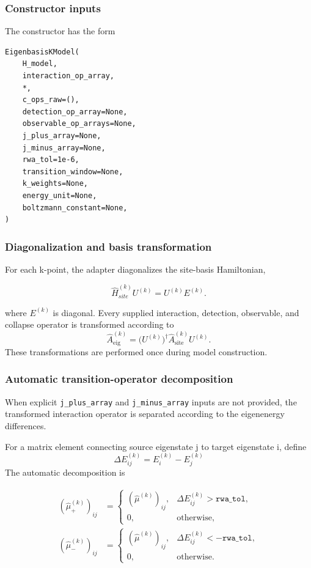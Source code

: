 \documentclass[11pt]{article}
\begin{document}
\subsubsection{Constructor inputs}
The constructor has the form 
\begin{verbatim}
EigenbasisKModel(
    H_model,
    interaction_op_array,
    *,
    c_ops_raw=(),
    detection_op_array=None,
    observable_op_arrays=None,
    j_plus_array=None,
    j_minus_array=None,
    rwa_tol=1e-6,
    transition_window=None,
    k_weights=None,
    energy_unit=None,
    boltzmann_constant=None,
)
\end{verbatim}

\subsubsection{Diagonalization and basis transformation}
For each k-point, the adapter diagonalizes the site-basis Hamiltonian,

\begin{equation}
    \hat{H}_{site}^{(k)}U^{(k)} = U^{(k)} E^{(k)}. 
\end{equation}

where $E^{(k)}$ is diagonal. Every supplied interaction, detection, observable, and collapse operator is transformed according to
\begin{equation}
    \hat{A}_{\mathrm{eig}}^{(k)} = \big(U^{(k)}\big)^\dagger \hat{A}_{\mathrm{site}}^{(k)} U^{(k)}.
\end{equation}
These transformations are performed once during model construction.

\subsubsection{Automatic transition-operator decomposition}
\label{sec:auto_decomposition}
When explicit \texttt{j\_plus\_array} and \texttt{j\_minus\_array} inputs are not provided, the transformed interaction operator is separated according to the eigenenergy differences. 

For a matrix element connecting source eigenstate j to target eigenstate i, define
\begin{equation}
    \Delta E_{ij}^{(k)} = E_i^{(k)} - E_j^{(k)}
\end{equation}
The automatic decomposition is

\begin{align}
\left(\hat{\mu}_{+}^{(k)}\right)_{ij}
&=\begin{cases}\left(\hat{\mu}^{(k)}\right)_{ij},
&\Delta E_{ij}^{(k)}>\texttt{rwa\_tol},\\0,
&
\text{otherwise},
\end{cases}
\\[4pt]
\left(\hat{\mu}_{-}^{(k)}\right)_{ij}
&=
\begin{cases}
\left(\hat{\mu}^{(k)}\right)_{ij},
&
\Delta E_{ij}^{(k)}<-\texttt{rwa\_tol},\\
0,&\text{otherwise}.
\end{cases}
\end{align}
\end{document}
